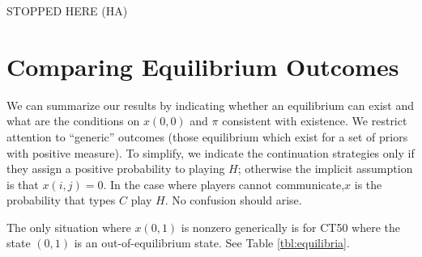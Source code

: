 \documentclass[12pt]{article}
\theoremstyle{definition}
\theoremstyle{remark}
\begin{document}
STOPPED HERE (HA)

\section{Comparing Equilibrium Outcomes}
We can summarize our results by indicating whether an equilibrium can exist and what are the conditions on $x(0,0)$ and $\pi$ consistent with existence. We restrict attention to ``generic'' outcomes (those equilibrium which exist for a  set of priors with positive measure). To simplify, we indicate the continuation strategies only if they assign a positive probability to playing $H$; otherwise the implicit assumption is that $x(i,j)=0$. In the case where players cannot communicate,$x$ is the probability that types $C$ play $H$. No confusion should arise. 

The only situation where $x(0,1)$ is nonzero generically is for CT50 where the state $(0,1)$ is an out-of-equilibrium state.
See Table \ref{tbl:equilibria}.
%
\end{document}
